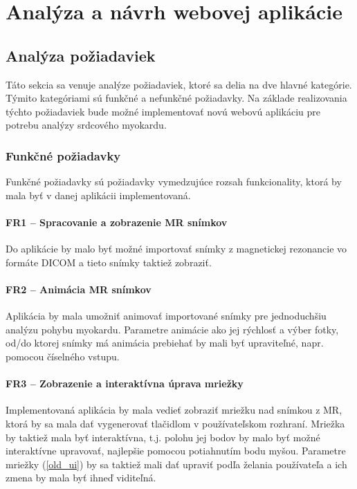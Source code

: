 \chapter {Analýza a návrh webovej aplikácie}

\section {Analýza požiadaviek}
Táto sekcia sa venuje analýze požiadaviek, ktoré sa delia na dve hlavné kategórie. Týmito kategóriami sú funkčné a nefunkčné požiadavky.
Na základe realizovania týchto požiadaviek bude možné implementovať novú webovú aplikáciu pre potrebu analýzy srdcového myokardu.

\subsection {Funkčné požiadavky}
Funkčné požiadavky sú požiadavky vymedzujúce rozsah funkcionality, ktorá by mala byť v danej aplikácii implementovaná.

\subsubsection {FR1 -- Spracovanie a zobrazenie MR snímkov}\label{fr1}
Do aplikácie by malo byť možné importovať snímky z magnetickej rezonancie vo formáte DICOM a tieto snímky taktiež zobraziť.

\subsubsection {FR2 -- Animácia MR snímkov}\label{fr2}
Aplikácia by mala umožniť animovať importované snímky pre jednoduchšiu analýzu pohybu myokardu. Parametre animácie ako jej rýchlosť a výber fotky, od/do ktorej snímky má animácia prebiehať by mali byť upraviteľné, napr. pomocou číselného vstupu.

\subsubsection {FR3 -- Zobrazenie a interaktívna úprava mriežky}\label{fr3}
Implementovaná aplikácia by mala vedieť zobraziť mriežku nad snímkou z MR, ktorá by sa mala dať vygenerovať tlačidlom v používateľskom rozhraní. Mriežka by taktiež mala byť interaktívna, t.j. polohu jej bodov by malo byť možné interaktívne upravovať, najlepšie pomocou potiahnutím bodu myšou. Parametre mriežky (\ref{old_ui}) by sa taktiež mali dať upraviť podľa želania používateľa a ich zmena by mala byť ihneď viditeľná.

